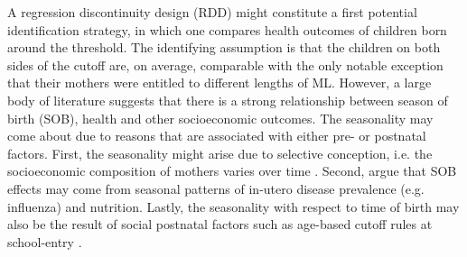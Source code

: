 A regression discontinuity design (RDD) might constitute a first potential identification strategy, in which one compares health outcomes of children born around the threshold. The identifying assumption is that the children on both sides of the cutoff are, on average, comparable with the only notable exception that their mothers were entitled to different lengths of ML. However, a large body of literature suggests that there is a strong relationship between season of birth (SOB), health and other socioeconomic outcomes. The seasonality may come about due to reasons that are associated with either pre- or postnatal factors. First, the seasonality might arise due to selective conception, i.e. the socioeconomic composition of mothers varies over time \citep{buckles2013season}. Second, \cite{currie2013within} argue that SOB effects may come from seasonal patterns of in-utero disease prevalence (e.g. influenza) and nutrition. Lastly, the seasonality with respect to time of birth may also be the result of social postnatal factors such as age-based cutoff rules at school-entry \citep{black2011too}.


